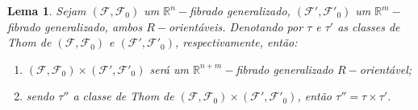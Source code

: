 \documentclass[12pt,oneside]{book} %
\newtheorem{lem}    {\hspace{0.5cm}Lema}[chapter]
\newcommand{\R}{\mathbb{R}}
\begin{document}
\begin{lem}\label{lema_thom_3}
	Sejam $(\mathcal{F},\mathcal{F}_{0})$ um $\R^{n}-$fibrado generalizado, $(\mathcal{F'},\mathcal{F'}_{0})$ um $\R^{m}-$fibrado generalizado, ambos $R-$orientáveis. Denotando por $\tau$ e $\tau'$ as classes de Thom de $(\mathcal{F},\mathcal{F}_{0})$ e $(\mathcal{F'},\mathcal{F'}_{0})$, respectivamente, então:
	\begin{enumerate}
		\item $(\mathcal{F},\mathcal{F}_{0})\times (\mathcal{F'},\mathcal{F'}_{0})$ será um $\R^{n+m}-$fibrado generalizado $R-$orientável;
		\item sendo $\tau''$ a classe de Thom de $(\mathcal{F},\mathcal{F}_{0})\times (\mathcal{F'},\mathcal{F'}_{0})$, então $\tau''=\tau\times\tau'$.
	\end{enumerate}
\end{lem}
\end{document}
